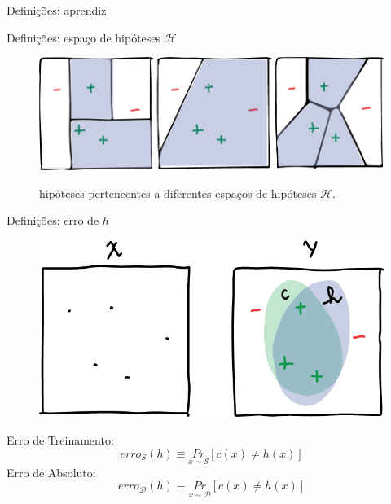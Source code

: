 \documentclass[10pt, professionalfonts]{beamer}
\begin{document}
{\begin{frame}{Definições: aprendiz}
\end{frame}
\begin{frame}{Definições: espaço de hipóteses  $\mathcal{H}$}
  \begin{figure}[!htp]
    \centering
    \includegraphics[width=.95\textwidth]{hspaces}
    \label{hspaces}
    \caption{hipóteses pertencentes a diferentes espaços de hipóteses $\mathcal{H}$.}
\end{figure}

\end{frame}

\begin{frame}{Definições: erro de $h$}
  \begin{figure}[!htp]
    \centering
    \includegraphics[width=.8\textwidth]{conceptVShypothesis}
    \label{conceptVShypothesis}
\end{figure}
Erro de Treinamento:\begin{equation}
  erro_{S}(h) \equiv \underset{x \sim \mathcal{S}}{Pr}[c(x) \neq h(x)]
\end{equation}
Erro de Absoluto:
\begin{equation}
  erro_{\mathcal{D}}(h) \equiv \underset{x \sim \mathcal{D}}{Pr}[c(x) \neq h(x)]
\end{equation}
\end{frame}




}
\end{document}
